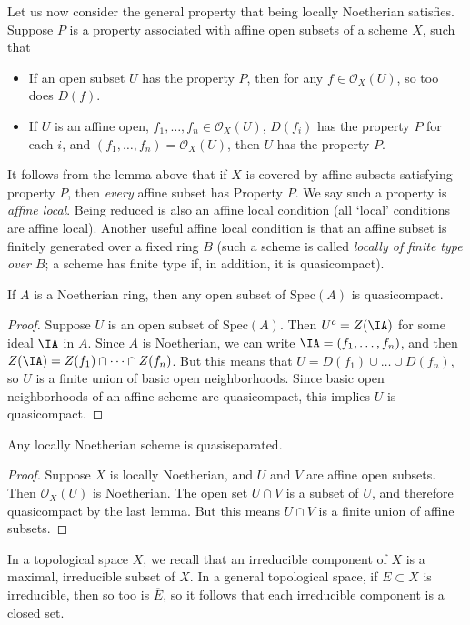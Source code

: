 Let us now consider the general property that being locally Noetherian satisfies. Suppose $P$ is a property associated with affine open subsets of a scheme $X$, such that
%
\begin{itemize}
    \item If an open subset $U$ has the property $P$, then for any $f \in \mathcal{O}_X(U)$, so too does $D(f)$.
    \item If $U$ is an affine open, $f_1,\dots,f_n \in \mathcal{O}_X(U)$, $D(f_i)$ has the property $P$ for each $i$, and $(f_1,\dots,f_n) = \mathcal{O}_X(U)$, then $U$ has the property $P$.
\end{itemize}
%
It follows from the lemma above that if $X$ is covered by affine subsets satisfying property $P$, then \emph{every} affine subset has Property $P$. We say such a property is \emph{affine local}. Being reduced is also an affine local condition (all `local' conditions are affine local). Another useful affine local condition is that an affine subset is finitely generated over a fixed ring $B$ (such a scheme is called \emph{locally of finite type over $B$}; a scheme has finite type if, in addition, it is quasicompact).

\begin{lemma}
    If $A$ is a Noetherian ring, then any open subset of $\text{Spec}(A)$ is quasicompact.
\end{lemma}
\begin{proof}
    Suppose $U$ is an open subset of $\text{Spec}(A)$. Then $U^c = Z(\IA)$ for some ideal $\IA$ in $A$. Since $A$ is Noetherian, we can write $\IA = (f_1,\dots,f_n)$, and then $Z(\IA) = Z(f_1) \cap \dots \cap Z(f_n)$. But this means that $U = D(f_1) \cup \dots \cup D(f_n)$, so $U$ is a finite union of basic open neighborhoods. Since basic open neighborhoods of an affine scheme are quasicompact, this implies $U$ is quasicompact.
\end{proof}

\begin{theorem}
    Any locally Noetherian scheme is quasiseparated.
\end{theorem}
\begin{proof}
    Suppose $X$ is locally Noetherian, and $U$ and $V$ are affine open subsets. Then $\mathcal{O}_X(U)$ is Noetherian. The open set $U \cap V$ is a subset of $U$, and therefore quasicompact by the last lemma. But this means $U \cap V$ is a finite union of affine subsets.
\end{proof}

In a topological space $X$, we recall that an irreducible component of $X$ is a maximal, irreducible subset of $X$. In a general topological space, if $E \subset X$ is irreducible, then so too is $\overline{E}$, so it follows that each irreducible component is a closed set.

